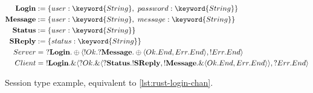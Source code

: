 \begin{figure}
    \begin{align*}
        \mathbf{Login}   & := \{user: \keyword{String},~password: \keyword{String}\}                                                                                                 \\
        \mathbf{Message} & := \{user: \keyword{String},~message: \keyword{String}\}                                                                                                  \\
        \mathbf{Status}  & := \{user: \keyword{String}\}                                                                                                                             \\
        \mathbf{SReply}  & := \{status: \keyword{String}\}                                                                                                                           \\
        Server           & = ~?\mathbf{Login}.\oplus\langle !Ok.?\mathbf{Message}.\oplus\langle Ok.End, Err.End \rangle, !Err.End\rangle                                             \\
        Client           & = ~!\mathbf{Login}.\&\langle ?Ok.\&\langle ?\mathbf{Status}.!\mathbf{SReply}, !\mathbf{Message}.\&\langle Ok.End, Err.End \rangle\rangle, ?Err.End\rangle
    \end{align*}
    \caption{Session type example, equivalent to \autoref{lst:rust-login-chan}.}
    \label{eq:session-types}
\end{figure}